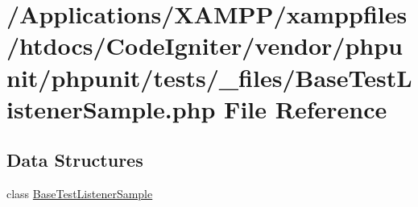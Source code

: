 \hypertarget{_base_test_listener_sample_8php}{}\section{/\+Applications/\+X\+A\+M\+P\+P/xamppfiles/htdocs/\+Code\+Igniter/vendor/phpunit/phpunit/tests/\+\_\+files/\+Base\+Test\+Listener\+Sample.php File Reference}
\label{_base_test_listener_sample_8php}
\subsection*{Data Structures}
\begin{DoxyCompactItemize}
\item 
class \mbox{\hyperlink{class_base_test_listener_sample}{Base\+Test\+Listener\+Sample}}
\end{DoxyCompactItemize}
